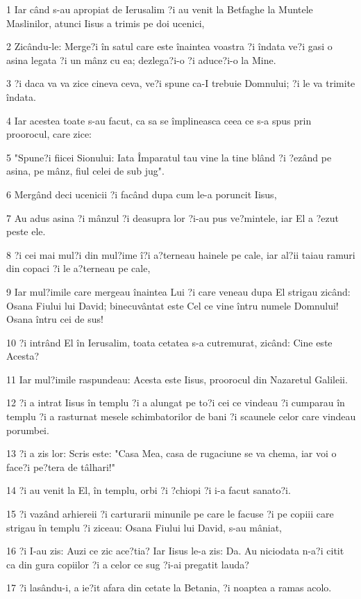 \par 1 Iar când s-au apropiat de Ierusalim ?i au venit la Betfaghe la Muntele Maslinilor, atunci Iisus a trimis pe doi ucenici,
\par 2 Zicându-le: Merge?i în satul care este înaintea voastra ?i îndata ve?i gasi o asina legata ?i un mânz cu ea; dezlega?i-o ?i aduce?i-o la Mine.
\par 3 ?i daca va va zice cineva ceva, ve?i spune ca-I trebuie Domnului; ?i le va trimite îndata.
\par 4 Iar acestea toate s-au facut, ca sa se împlineasca ceea ce s-a spus prin proorocul, care zice:
\par 5 "Spune?i fiicei Sionului: Iata Împaratul tau vine la tine blând ?i ?ezând pe asina, pe mânz, fiul celei de sub jug".
\par 6 Mergând deci ucenicii ?i facând dupa cum le-a poruncit Iisus,
\par 7 Au adus asina ?i mânzul ?i deasupra lor ?i-au pus ve?mintele, iar El a ?ezut peste ele.
\par 8 ?i cei mai mul?i din mul?ime î?i a?terneau hainele pe cale, iar al?ii taiau ramuri din copaci ?i le a?terneau pe cale,
\par 9 Iar mul?imile care mergeau înaintea Lui ?i care veneau dupa El strigau zicând: Osana Fiului lui David; binecuvântat este Cel ce vine întru numele Domnului! Osana întru cei de sus!
\par 10 ?i intrând El în Ierusalim, toata cetatea s-a cutremurat, zicând: Cine este Acesta?
\par 11 Iar mul?imile raspundeau: Acesta este Iisus, proorocul din Nazaretul Galileii.
\par 12 ?i a intrat Iisus în templu ?i a alungat pe to?i cei ce vindeau ?i cumparau în templu ?i a rasturnat mesele schimbatorilor de bani ?i scaunele celor care vindeau porumbei.
\par 13 ?i a zis lor: Scris este: "Casa Mea, casa de rugaciune se va chema, iar voi o face?i pe?tera de tâlhari!"
\par 14 ?i au venit la El, în templu, orbi ?i ?chiopi ?i i-a facut sanato?i.
\par 15 ?i vazând arhiereii ?i carturarii minunile pe care le facuse ?i pe copiii care strigau în templu ?i ziceau: Osana Fiului lui David, s-au mâniat,
\par 16 ?i I-au zis: Auzi ce zic ace?tia? Iar Iisus le-a zis: Da. Au niciodata n-a?i citit ca din gura copiilor ?i a celor ce sug ?i-ai pregatit lauda?
\par 17 ?i lasându-i, a ie?it afara din cetate la Betania, ?i noaptea a ramas acolo.

